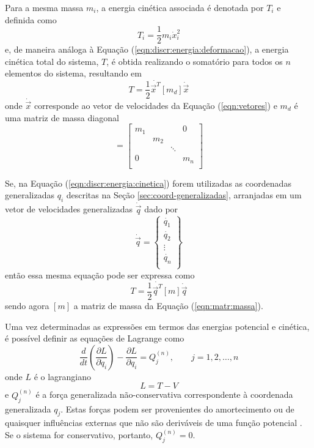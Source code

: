 \documentclass[12pt,openright,oneside,a4paper,
	chapter=TITLE,section=TITLE,
	english,brazil]{abntex2}
\begin{document}
	Para a mesma massa $m_i$, a energia cinética associada é denotada por $T_i$ e definida como \cite{rao:2008}
	\begin{equation}
		T_i = \frac{1}{2}m_i\dot{x}_i^2
	\end{equation}
	e, de maneira análoga à Equação (\ref{eqn:discr:energia:deformacao}), a energia cinética total do sistema, $T$, é obtida realizando o somatório para todos os $n$ elementos do sistema, resultando em \cite{savi:2017}
	\begin{equation}\label{eqn:discr:energia:cinetica}
		T = \frac{1}{2}\dot{\vec{x}^T}[m_d]\dot{\vec{x}}
	\end{equation}
	onde $\dot{\vec{x}}$ corresponde ao vetor de velocidades da Equação (\ref{eqn:vetores}) e $m_d$ é uma matriz de massa diagonal
	\begin{equation}
		[m_d] =
		\begin{bmatrix}
			m_1 & & & 0\\
			& m_2\\
			& & \ddots\\
			0 & & & m_n\\
		\end{bmatrix}
	\end{equation}
	
	Se, na Equação (\ref{eqn:discr:energia:cinetica}) forem utilizadas as coordenadas generalizadas $q_i$ descritas na Seção \ref{sec:coord-generalizadas}, arranjadas em um vetor de velocidades generalizadas $\dot{\vec{q}}$ dado por
	\begin{equation}
		\dot{\vec{q}} = 
		\begin{Bmatrix}
			\dot{q_1}\\ \dot{q_2}\\ \vdots\\ \dot{q_n}\\
		\end{Bmatrix}
	\end{equation}
	então essa mesma equação pode ser expressa como \cite{rao:2008}
	\begin{equation}
		T = \frac{1}{2}\dot{\vec{q}^T}[m]\dot{\vec{q}}
	\end{equation}
	sendo agora $[m]$ a matriz de massa da Equação (\ref{eqn:matr:massa}).
	
	Uma vez determinadas as expressões em termos das energias potencial e cinética, é possível definir as equações de Lagrange como \cite{savi:2017}
	\begin{equation} \label{eqn:lagrange}
		\frac{d}{dt}\left(\frac{\partial L}{\partial \dot{q}_i}\right) - \frac{\partial L}{\partial q_i} = Q_j^{(n)}, \qquad j = 1, 2, \dots, n
	\end{equation}
	onde $L$ é o lagrangiano
	\begin{equation}
		L = T-V
	\end{equation}
	e $ Q_j^{(n)} $ é a força generalizada não-conservativa correspondente à coordenada generalizada $q_j$. Estas forças podem ser provenientes do amortecimento ou de quaisquer influências externas que não são deriváveis de uma função potencial \cite{rao:2008}. Se o sistema for conservativo, portanto, $ Q_j^{(n)} = 0 $.
	
\end{document}
